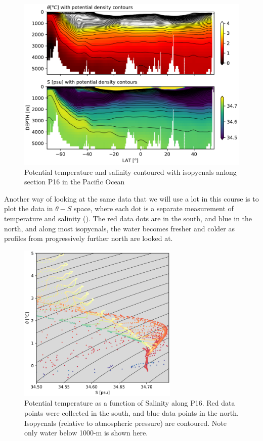 \begin{figure}[hbt]
\includegraphics[width=4.5in]{./figs/P16PdenwTS.pdf}
\caption{Potential temperature and salinity contoured with isopycnals anlong section P16 in the Pacific Ocean}
\label{fig:P16PdenwTS}      
\end{figure}

Another way of looking at the same data that we will use a lot in this course is to plot the data in $\theta-S$ space, where each dot is a separate measurement of temperature and salinity ().  The red data dots are in the south, and blue in the north, and along most isopycnals, the water becomes fresher and colder as profiles from progressively further north are looked at.

\begin{figure}[hbt]
    \includegraphics[width=3.0in]{./figs/P16TSzoom}
    \caption{Potential temperature as a function of Salinity along P16. Red data points were collected in the south, and blue data points in the north.  Isopycnals (relative to atmospheric pressure) are contoured.  Note only water below 1000-m is shown here.}  
    \label{fig:P16TSzoom}
\end{figure}

